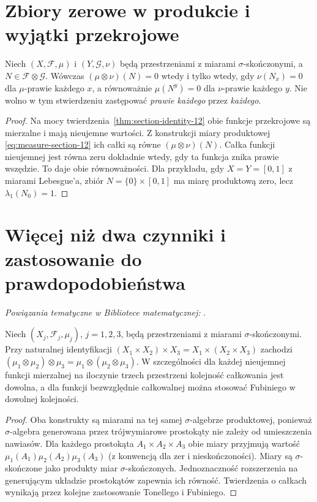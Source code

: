 \section{Zbiory zerowe w produkcie i wyjątki przekrojowe}

\begin{wniosek}
\label{cor:null-sections-12}
Niech $(X,\mathcal F,\mu)$ i $(Y,\mathcal G,\nu)$
będą przestrzeniami z miarami $\sigma$-skończonymi,
a $N\in\mathcal F\otimes\mathcal G$. Wówczas
$(\mu\otimes\nu)(N)=0$ wtedy i tylko wtedy, gdy
$\nu(N_x)=0$ dla $\mu$-prawie każdego $x$, a równoważnie
$\mu(N^y)=0$ dla $\nu$-prawie każdego $y$.
Nie wolno w tym stwierdzeniu zastępować
\emph{prawie każdego} przez \emph{każdego}.
\end{wniosek}
\begin{proof}
Na mocy twierdzenia~\ref{thm:section-identity-12}
obie funkcje przekrojowe są mierzalne i mają
nieujemne wartości. Z konstrukcji miary produktowej
\eqref{eq:measure-section-12} ich całki są równe
$(\mu\otimes\nu)(N)$. Całka funkcji nieujemnej
jest równa zeru dokładnie wtedy, gdy ta funkcja
znika prawie wszędzie. To daje obie równoważności.
Dla przykładu, gdy $X=Y=[0,1]$ z miarami Lebesgue'a,
zbiór $N=\{0\}\times[0,1]$ ma miarę produktową zero,
lecz $\lambda_1(N_0)=1$.
\end{proof}

\section{Więcej niż dwa czynniki i zastosowanie do prawdopodobieństwa}

\noindent\emph{Powiązania tematyczne w Bibliotece matematycznej:} .


\begin{wniosek}
\label{cor:associative-product-12}
Niech $(X_j,\mathcal F_j,\mu_j)$, $j=1,2,3$,
będą przestrzeniami z miarami $\sigma$-skończonymi.
Przy naturalnej identyfikacji
$(X_1\times X_2)\times X_3=X_1\times(X_2\times X_3)$
zachodzi
$(\mu_1\otimes\mu_2)\otimes\mu_3
=\mu_1\otimes(\mu_2\otimes\mu_3)$.
W szczególności dla każdej nieujemnej funkcji
mierzalnej na iloczynie trzech przestrzeni
kolejność całkowania jest dowolna, a dla funkcji
bezwzględnie całkowalnej można stosować Fubiniego
w dowolnej kolejności.
\end{wniosek}
\begin{proof}
Oba konstrukty są miarami na tej samej
$\sigma$-algebrze produktowej, ponieważ
$\sigma$-algebra generowana przez trójwymiarowe
prostokąty nie zależy od umieszczenia nawiasów.
Dla każdego prostokąta $A_1\times A_2\times A_3$
obie miary przyjmują wartość
$\mu_1(A_1)\mu_2(A_2)\mu_3(A_3)$
(z konwencją dla zer i nieskończoności).
Miary są $\sigma$-skończone jako produkty miar
$\sigma$-skończonych. Jednoznaczność rozszerzenia
na generującym układzie prostokątów zapewnia ich
równość. Twierdzenia o całkach wynikają przez
kolejne zastosowanie Tonellego i Fubiniego.
\end{proof}

